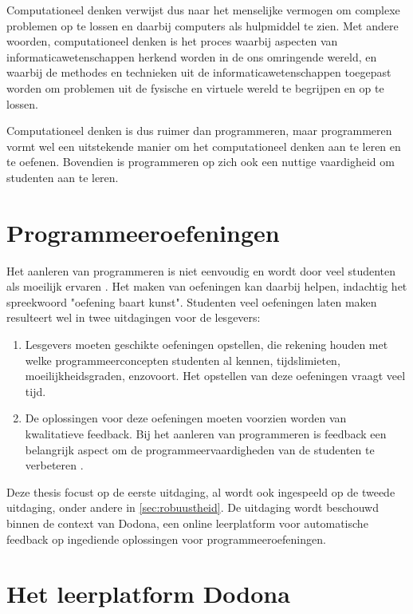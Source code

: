 \begin{displayquote}
    Computationeel denken verwijst dus naar het menselijke vermogen om complexe problemen op te lossen en daarbij computers als hulpmiddel te zien.
    Met andere woorden, computationeel denken is het proces waarbij aspecten van informaticawetenschappen herkend worden in de ons omringende wereld, en waarbij de methodes en technieken uit de informaticawetenschappen toegepast worden om problemen uit de fysische en virtuele wereld te begrijpen en op te lossen.
\end{displayquote}

Computationeel denken is dus ruimer dan programmeren, maar programmeren vormt wel een uitstekende manier om het computationeel denken aan te leren en te oefenen.
Bovendien is programmeren op zich ook een nuttige vaardigheid om studenten aan te leren.

\section{Programmeeroefeningen}\label{sec:programmeeroefeningen}

Het aanleren van programmeren is niet eenvoudig en wordt door veel studenten als moeilijk ervaren \autocite{10.1145/3293881.3295779}.
Het maken van oefeningen kan daarbij helpen, indachtig het spreekwoord "oefening baart kunst".
Studenten veel oefeningen laten maken resulteert wel in twee uitdagingen voor de lesgevers:
\begin{enumerate}
    \item Lesgevers moeten geschikte oefeningen opstellen, die rekening houden met welke programmeerconcepten studenten al kennen, tijdslimieten, moeilijkheidsgraden, enzovoort.
    Het opstellen van deze oefeningen vraagt veel tijd.
    \item De oplossingen voor deze oefeningen moeten voorzien worden van kwalitatieve feedback.
    Bij het aanleren van programmeren is feedback een belangrijk aspect om de programmeervaardigheden van de studenten te verbeteren \autocite{10.1145/2899415.2899422}.
\end{enumerate}

Deze thesis focust op de eerste uitdaging, al wordt ook ingespeeld op de tweede uitdaging, onder andere in \cref{sec:robuustheid}.
De uitdaging wordt beschouwd binnen de context van Dodona, een online leerplatform voor automatische feedback op ingediende oplossingen voor programmeeroefeningen.

\section{Het leerplatform Dodona}\label{sec:wat-is-dodona}

